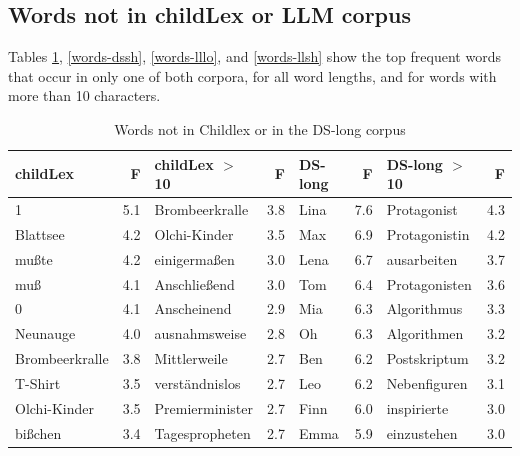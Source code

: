 \documentclass[manuscript]{stjour}
\begin{document}
\subsection{Words not in childLex or LLM corpus}

Tables \ref{words-dslo}, \ref{words-dssh}, \ref{words-lllo}, and \ref{words-llsh} show the top frequent words that occur in only one of both corpora, for all word lengths, and for words with more than 10 characters.

\begin{table}[!htbp]
\caption{Words not in Childlex or in the DS-long corpus}
\centering
\begin{tabular}{lrlrlrlr}
  \hline
childLex & F & childLex $>$10 & F & DS-long & F & DS-long $>$10 & F \\ 
  \hline
1 & 5.1 & Brombeerkralle & 3.8 & Lina & 7.6 & Protagonist & 4.3 \\ 
  Blattsee & 4.2 & Olchi-Kinder & 3.5 & Max & 6.9 & Protagonistin & 4.2 \\ 
  mußte & 4.2 & einigermaßen & 3.0 & Lena & 6.7 & ausarbeiten & 3.7 \\ 
  muß & 4.1 & Anschließend & 3.0 & Tom & 6.4 & Protagonisten & 3.6 \\ 
  0 & 4.1 & Anscheinend & 2.9 & Mia & 6.3 & Algorithmus & 3.3 \\ 
  Neunauge & 4.0 & ausnahmsweise & 2.8 & Oh & 6.3 & Algorithmen & 3.2 \\ 
  Brombeerkralle & 3.8 & Mittlerweile & 2.7 & Ben & 6.2 & Postskriptum & 3.2 \\ 
  T-Shirt & 3.5 & verständnislos & 2.7 & Leo & 6.2 & Nebenfiguren & 3.1 \\ 
  Olchi-Kinder & 3.5 & Premierminister & 2.7 & Finn & 6.0 & inspirierte & 3.0 \\ 
  bißchen & 3.4 & Tagespropheten & 2.7 & Emma & 5.9 & einzustehen & 3.0 \\ 
   \hline
\end{tabular}
\label{words-dslo}
\end{table}
\end{document}
